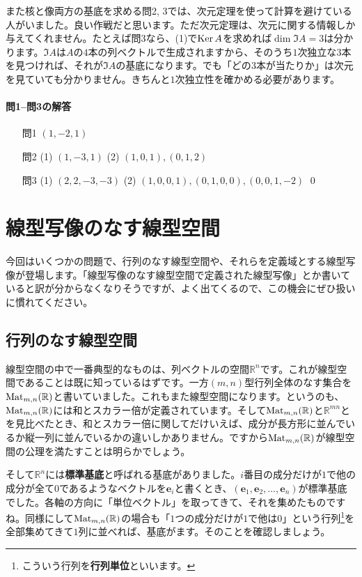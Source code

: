 また核と像両方の基底を求める問2, 3では、次元定理を使って計算を避けている人がいました。良い作戦だと思います。ただ次元定理は、次元に関する情報しか与えてくれません。たとえば問3なら、(1)で$\operatorname{Ker} A$を求めれば$\dim \Im A = 3$は分かります。$\Im A$は$A$の$4$本の列ベクトルで生成されますから、そのうち$1$次独立な$3$本を見つければ、それが$\Im A$の基底になります。でも「どの$3$本が当たりか」は次元を見ていても分かりません。きちんと$1$次独立性を確かめる必要があります。

\paragraph{問1--問3の解答}
\begin{itemize}
\item[問1] $(1, -2, 1)$
\item[問2] (1) $(1, -3, 1)$ (2) $(1, 0, 1), (0, 1, 2)$
\item[問3] (1) $(2, 2, -3, -3)$ (2) $(1, 0, 0 ,1), (0, 1, 0 ,0), (0, 0, 1 ,-2)$ \qed
\end{itemize}

\section{線型写像のなす線型空間}

今回はいくつかの問題で、行列のなす線型空間や、それらを定義域とする線型写像が登場します。「線型写像のなす線型空間で定義された線型写像」とか書いていると訳が分からなくなりそうですが、よく出てくるので、この機会にぜひ扱いに慣れてください。

\subsection{行列のなす線型空間}

線型空間の中で一番典型的なものは、列ベクトルの空間$\mathbb{R}^n$です。これが線型空間であることは既に知っているはずです。一方$(m, n)$型行列全体のなす集合を$\operatorname{Mat}_{m,n}(\mathbb{R})$と書いていました。これもまた線型空間になります。というのも、$\operatorname{Mat}_{m, n}(\mathbb{R})$には和とスカラー倍が定義されています。そして$\operatorname{Mat}_{m, n}(\mathbb{R})$と$\mathbb{R}^{mn}$とを見比べたとき、和とスカラー倍に関してだけいえば、成分が長方形に並んでいるか縦一列に並んでいるかの違いしかありません。ですから$\operatorname{Mat}_{m, n}(\mathbb{R})$が線型空間の公理を満たすことは明らかでしょう。

そして$\mathbb{R}^n$には\textbf{標準基底}と呼ばれる基底がありました。$i$番目の成分だけが$1$で他の成分が全て$0$であるようなベクトルを$\bm{e}_i$と書くとき、$(\bm{e}_1, \bm{e}_2, \ldots, \bm{e}_n)$が標準基底でした。各軸の方向に「単位ベクトル」を取ってきて、それを集めたものですね。同様にして$\operatorname{Mat}_{m, n}(\mathbb{R})$の場合も「$1$つの成分だけが$1$で他は$0$」という行列\footnote{こういう行列を\textbf{行列単位}といいます。}を全部集めてきて$1$列に並べれば、基底がます。そのことを確認しましょう。

